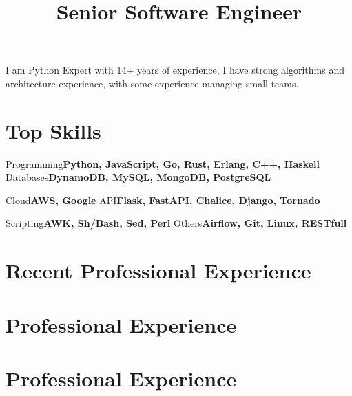 \documentclass[11pt,a4paper]{moderncv}
\title{Senior Software Engineer}
\begin{document}

\maketitle

I am Python Expert with 14+ years of experience, I have strong algorithms and
architecture experience, with some experience managing small teams.

\section{Top Skills}

    \cvcomputer
        {Programming}{\textbf{Python, JavaScript, Go, Rust, Erlang, C++, Haskell}}
        {Databases}{\textbf{DynamoDB, MySQL, MongoDB, PostgreSQL}}

    \cvcomputer
        {Cloud}{\textbf{AWS, Google}}
        {API}{\textbf{Flask, FastAPI, Chalice, Django, Tornado}}

    \cvcomputer
        {Scripting}{\textbf{AWK, Sh/Bash, Sed, Perl}}
        {Others}{\textbf{Airflow, Git, Linux, RESTfull}}


\section{Recent Professional Experience}                                         %
\section{Professional Experience}                                                %
\section{Professional Experience}                                                %

\end{document}
